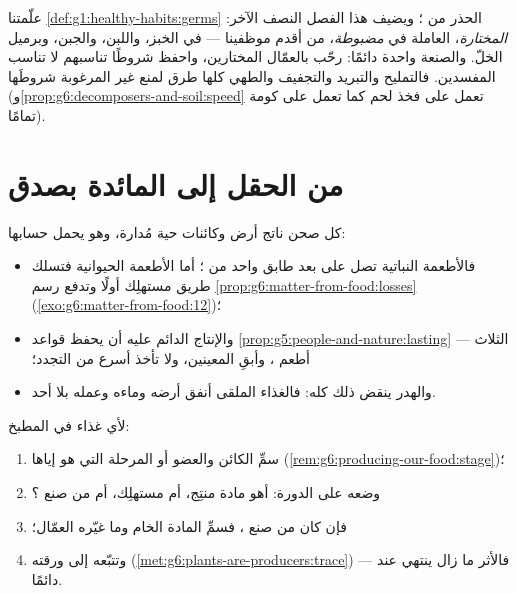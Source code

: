 \begin{remark}\label{rem:g6:producing-our-food:goodbad}
علّمتنا  \cref{def:g1:healthy-habits:germs} الحذر من
؛ ويضيف هذا الفصل النصف الآخر: 
\emph{المختارة}، العاملة في  \emph{مضبوطة}، من أقدم موظفينا ---
في الخبز، واللبن، والجبن، وبرميل الخلّ. والصنعة واحدة دائمًا: رحّب
بالعمّال المختارين، واحفظ شروطًا تناسبهم لا تناسب المفسدين. فالتمليح
والتبريد والتجفيف والطهي كلها طرق لمنع  غير المرغوبة
شروطَها (و\cref{prop:g6:decomposers-and-soil:speed} تعمل على فخذ
لحم كما تعمل على كومة  تمامًا).
\end{remark}

\section{من الحقل إلى المائدة بصدق}

\begin{proposition}\label{prop:g6:producing-our-food:costs}
كل صحن ناتج أرض وكائنات حية مُدارة، وهو يحمل حسابها:
\begin{itemize}
  \item فالأطعمة النباتية تصل على بعد طابق واحد من ؛ أما
        الأطعمة الحيوانية فتسلك طريق مستهلِك أولًا وتدفع رسم
        \cref{prop:g6:matter-from-food:losses}
        (\cref{exo:g6:matter-from-food:12})؛
  \item والإنتاج الدائم عليه أن يحفظ قواعد
        \cref{prop:g5:people-and-nature:lasting} الثلاث --- أطعم
        ، وأبقِ المعينين، ولا تأخذ أسرع من التجدد؛
  \item والهدر ينقض ذلك كله: فالغذاء الملقى أنفق أرضه وماءه وعمله
        بلا أحد.
\end{itemize}
\end{proposition}
\admitted

\begin{method}\label{met:g6:producing-our-food:read}
لأي غذاء في المطبخ:
\begin{enumerate}
  \item سمِّ الكائن والعضو أو المرحلة التي هو إياها
        (\cref{rem:g6:producing-our-food:stage})؛
  \item وضعه على الدورة: أهو مادة منتِج، أم  مستهلِك، أم من
        صنع ؟
  \item فإن كان من صنع ، فسمِّ المادة الخام وما غيّره
        العمّال؛
  \item وتتبّعه إلى ورقته
        (\cref{met:g6:plants-are-producers:trace}) --- فالأثر ما
        زال ينتهي عند  دائمًا.
\end{enumerate}
\end{method}

